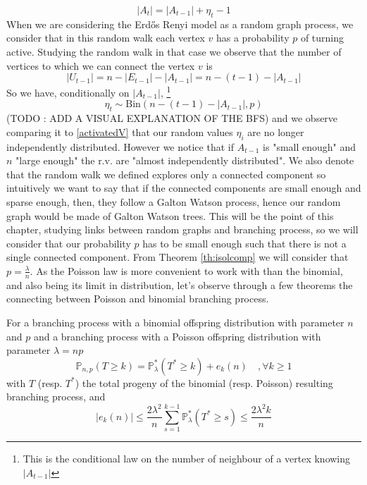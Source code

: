 \begin{equation}\label{eq:St}
	|A_t| = |A_{t-1}| + \eta_t - 1
\end{equation}
\newline
When we are considering the Erd\H{o}s Renyi model as a random graph process, we consider that in this random walk each vertex $v$ has a probability $p$ of turning active. 
Studying the random walk in that case we observe that the number of vertices to which we can connect the vertex $v$ is
\begin{equation}
	|U_{t-1}| = n - |E_{t-1}| - |A_{t-1}| = n - (t-1) - |A_{t-1}|
\end{equation}
So we have, conditionally on $|A_{t-1}|$,
\footnote{This is the conditional law on the number of neighbour of a vertex knowing $|A_{t-1}|$}
\begin{equation}
	\eta_t \sim \text{Bin}( n - (t-1) - |A_{t-1}|, p)
\end{equation}
(TODO : ADD A VISUAL EXPLANATION OF THE BFS)
and we observe comparing it to \eqref{activatedV} that our random values $\eta_i$ are no longer independently distributed. 
However we notice that if $A_{t-1}$ is "small enough" and $n$ "large enough" the r.v. are "almost independently distributed".
We also denote that the random walk we defined explores only a connected component so intuitively we want to say that if the connected components are small enough and sparse enough, then, they follow a Galton Watson process, hence our random graph would be made of Galton Watson trees.
This will be the point of this chapter, studying links between random graphs and branching process, so we will consider that our probability $p$ has to be small enough such that there is not a single connected component. From Theorem \ref{th:isolcomp} we will consider that $p=\frac{\lambda}{n}$.
\newline
As the Poisson law is more convenient to work with than the binomial, and also being its limit in distribution, let's observe through a few theorems the connecting between Poisson and binomial branching process.
\begin{theorem}\label{th:poibin}
For a branching process with a binomial offspring distribution with parameter $n$ and $p$ and a branching process with a Poisson offspring distribution with parameter $\lambda = np$
	\begin{equation}
		\mathbb{P}_{n,p}(T \geq k) = \mathbb{P}_{\lambda}^*(T^* \geq k) + e_k(n)\quad, \forall k \geq 1
	\end{equation}
	with $T$ (resp. $T^*$) the total progeny of the binomial (resp. Poisson) resulting branching process, and 
	\begin{equation}
		|e_k(n)| \leq \frac{2\lambda ^2}{n}\sum_{s=1}^{k-1} \mathbb{P}_{\lambda}^*(T^* \geq s) \leq \frac{2\lambda ^2k}{n}
	\end{equation}
\end{theorem}
